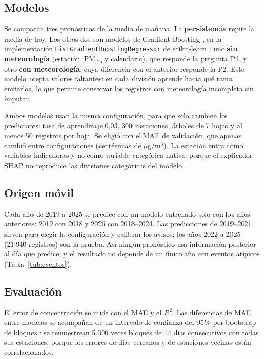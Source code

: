 \documentclass[conference]{IEEEtran}
\begin{document}
\subsection{Modelos}

Se comparan tres pronósticos de la media de mañana. La
\textbf{persistencia} repite la media de hoy. Los otros dos son modelos de
Gradient Boosting \cite{friedman2001greedy}, en la implementación
\texttt{HistGradientBoostingRegressor} de scikit-learn
\cite{pedregosa2011scikit}: uno \textbf{sin meteorología} (estación,
PM$_{2.5}$ y calendario), que responde la pregunta P1, y otro \textbf{con
meteorología}, cuya diferencia con el anterior responde la P2. Este modelo
acepta valores faltantes: en cada división aprende hacia qué rama
enviarlos, lo que permite conservar los registros con meteorología
incompleta sin imputar.

Ambos modelos usan la misma configuración, para que solo cambien los
predictores: tasa de aprendizaje 0,03, 300 iteraciones, árboles de 7 hojas
y al menos 50 registros por hoja. Se eligió con el MAE de validación, que
apenas cambió entre configuraciones (centésimas de $\mu$g/m$^3$). La
estación entra como variables indicadoras y no como variable categórica
nativa, porque el explicador SHAP no reproduce las divisiones categóricas
del modelo.

\subsection{Origen móvil}

Cada año de 2019 a 2025 se predice con un modelo entrenado solo con los
años anteriores: 2019 con 2018 y 2025 con 2018--2024. Las predicciones de
2019--2021 sirven para elegir la configuración y calibrar los avisos; los
años 2022 a 2025 (21.940 registros) son la prueba. Así ningún pronóstico
usa información posterior al día que predice, y el resultado no depende de
un único año con eventos atípicos (Tabla~\ref{tab:eventos}).

\subsection{Evaluación}

El error de concentración se mide con el MAE y el $R^2$. Las diferencias
de MAE entre modelos se acompañan de un intervalo de confianza del 95\,\%
por bootstrap de bloques \cite{kunsch1989jackknife}: se remuestrean 5.000
veces bloques de 14 días consecutivos con todas sus estaciones, porque los
errores de días cercanos y de estaciones vecinas están correlacionados.
\end{document}
